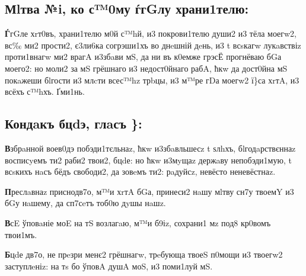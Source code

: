 \subsection[Молитва 11, ко святому Ангелу-Хранителю]
{Мlтва №i, ко с™0му ѓгGлу храни1телю:}

\textbf{Ѓ}гGле хrт0въ, храни1телю м0й с™hй, и3 покрови1телю души2 и3 тёла моегw2,
вс‰ ми2 прости2, є3ли6ка согрэши1хъ во днeшній дeнь, и3 t всsкагw
лукaвствіz проти1внагw ми2 врагA и3збaви мS, да ни въ к0емже грэсЁ
прогнёваю бGа моего2: но моли2 за мS грёшнаго и3 недост0йнаго рабA, ћкw
да дост0йна мS покaжеши бlгости и3 млcти всес™hz трbцы, и3 м™ре гDа
моегw2 ї\}са хrтA, и3 всёхъ с™hхъ. Ґми1нь.

\subsection[Кондак Богородице, глас 8]
{Кондaкъ бцdэ, глaсъ \}:}

\textbf{В}збрaнной воев0дэ побэди1тєльнаz, ћкw и3збaвльшесz t ѕлhхъ,
бlгодaрствєннаz восписyемъ ти2 раби2 твои2, бцdе: но ћкw и3мyщаz держaву
непобэди1мую, t всsкихъ нaсъ бёдъ свободи2, да зовeмъ ти2: рaдуйсz,
невёсто неневёстнаz.

\textbf{П}реслaвнаz приснодв7о, м™и хrтA бGа, принеси2 нaшу мlтву сн7у твоемY и3
бGу нaшему, да сп7сeтъ тоб0ю дyшы нaшz.

\textbf{В}сE ўповaніе моE на тS возлагaю, м™и б9іz, сохрани1 мz под8 кр0вомъ
твои1мъ.

\textbf{Б}цdе дв7о, не прeзри менє2 грёшнагw, трeбующа твоеS п0мощи и3 твоегw2
заступлeніz: на тs бо ўповA душA моS, и3 поми1луй мS.

